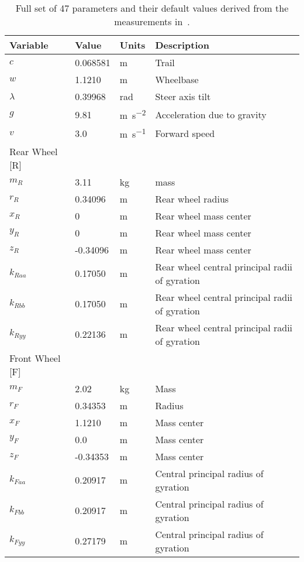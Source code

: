\documentclass{bmd2019a}
\begin{document}
\begin{table}
  \caption{Full set of 47 parameters and their default values derived from the
  measurements in~\cite{Moore2012}.}
  \label{tab:parameters}
  \begin{tabular}{llll}
    \toprule
    Variable & Value & Units & Description \\
    \midrule
    $c$ &  0.068581 & \si{\meter} & Trail \\
    $w$ &  1.1210 & \si{\meter} & Wheelbase \\
    $\lambda$ &  0.39968 & \si{\radian} & Steer axis tilt \\
    $g$ &  9.81 & \si{\meter\per\second\squared} & Acceleration due to gravity \\
    $v$ &  3.0 & \si{\meter\per\second} & Forward speed \\
    Rear Wheel [R] & & \\
    \midrule
    $m_R$ &  3.11 & \si{\kilogram} & mass \\
    $r_R$ &  0.34096 & \si{\meter} & Rear wheel radius \\
    $x_R$ & 0 & \si{\meter} & Rear wheel mass center \\
    $y_R$ & 0 & \si{\meter} & Rear wheel mass center \\
    $z_R$ & -0.34096 & \si{\meter} & Rear wheel mass center \\
    $k_{Raa}$ &  0.17050 & \si{\meter} & Rear wheel central principal radii of gyration \\
    $k_{Rbb}$ &  0.17050 & \si{\meter} & Rear wheel central principal radii of gyration  \\
    $k_{Ryy}$ &  0.22136 & \si{\meter} & Rear wheel central principal radii of gyration \\
    Front Wheel [F] & & \\
    \midrule
    $m_F$ &  2.02 & \si{\kilogram} & Mass \\
    $r_F$ &  0.34353 & \si{\meter} & Radius \\
    $x_F$ &  1.1210 & \si{\meter} & Mass center \\
    $y_F$ & 0.0 & \si{\meter} & Mass center \\
    $z_F$ & -0.34353 & \si{\meter} & Mass center \\
    $k_{Faa}$ &  0.20917 & \si{\meter} & Central principal radius of gyration \\
    $k_{Fbb}$ &  0.20917 & \si{\meter} & Central principal radius of gyration \\
    $k_{Fyy}$ &  0.27179 & \si{\meter} & Central principal radius of gyration \\

\end{tabular}
\end{table}
\end{document}
